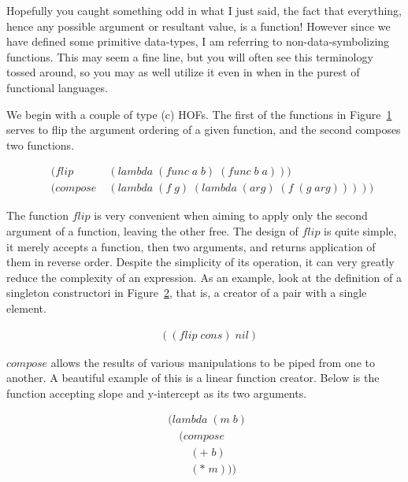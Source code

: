 Hopefully you caught something odd in what I just said, the fact that everything, 
hence any possible argument or resultant value, is a function! However since we 
have defined some primitive data-types, I am referring to non-data-symbolizing 
functions. This may seem a fine line, but you will often see this terminology 
tossed around, so you may as well utilize it even in when in the purest of 
functional languages.

We begin with a couple of type (c) HOFs. The first of the functions in
Figure~\ref{fig:flipAndCompose} serves to flip the argument ordering of a given
function, and the second composes two functions.  

\begin{figure}[htp]
\footnotesize
\caption{}\label{fig:flipAndCompose}
\begin{align*}
& (flip \; &(lambda \; (func \; a \; b) \; (func \; b \; a))) \; 
\\& (compose \; &(lambda \; (f \; g) \; (lambda \; (arg) \; (f \; (g \; arg))))) \; 
\end{align*}
\end{figure}

The function $flip$ is very convenient when aiming to apply only the second
argument of a function, leaving the other free. The design of $flip$ is quite
simple, it merely accepts a function, then two arguments, and returns
application of them in reverse order. Despite the simplicity of its operation,
it can very greatly reduce the complexity of an expression. As an example, look
at the definition of a singleton constructori in
Figure~\ref{fig:singletonConstructor}, that is, a creator of a pair with a
single element.

\begin{figure}[htp]
\footnotesize
\caption{}\label{fig:singletonConstructor}
\begin{align*}
& ((flip \; cons) \; nil)
\end{align*}
\end{figure}


$compose$ allows the results of various manipulations to be piped from one to 
another. A beautiful example of this is a linear function creator. Below is the 
function accepting slope and y-intercept as its two arguments.

\begin{figure}[htp]
\footnotesize
\caption{}\label{fig:linearFuncGen}
\begin{align*}
& (lambda \; (m \; b) \; 
\\& \quad (compose \; 
\\& \qquad (+ \; b) \; 
\\& \qquad (* \; m)))
\end{align*}
\end{figure}

